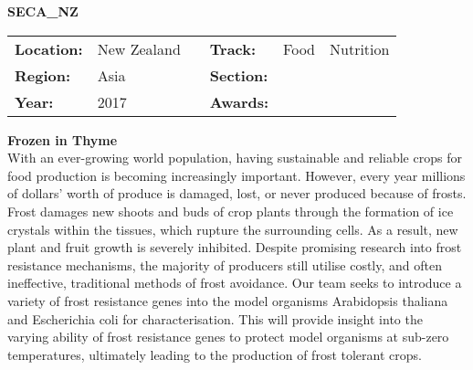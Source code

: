 \textbf{\uppercase{SECA\_NZ}}
\FloatBarrier
\begin{table}[h]
\begin{tabular}{lp{2.5cm}llll}
\textbf{Location:} & New Zealand & \multicolumn{1}{|l}{} & \textbf{Track:}   & Food & Nutrition \\
\textbf{Region:}   & Asia   & \multicolumn{1}{|l}{} & \textbf{Section:} &  \\
\textbf{Year:}     & 2017   & \multicolumn{1}{|l}{} & \textbf{Awards:}  &
\end{tabular}
\end{table}
\FloatBarrier
\noindent	\textbf{Frozen in Thyme} \vspace{.2cm}\\
With an ever-growing world population, having sustainable and reliable crops for food production
is becoming increasingly important. However, every year millions of dollars’ worth of produce is damaged, lost, or never produced because of frosts. Frost damages new shoots and buds of crop plants through the formation of ice crystals within the tissues, which rupture the surrounding cells. As a result, new plant and fruit growth is severely inhibited. Despite promising research into frost resistance mechanisms, the majority of producers still utilise costly, and often ineffective, traditional methods of frost avoidance. Our team seeks to introduce a variety of frost resistance genes into the model organisms Arabidopsis thaliana and Escherichia coli for characterisation. This will provide insight into the varying ability of frost resistance genes to protect model organisms at sub-zero temperatures, ultimately leading to the production of frost tolerant crops.
\vspace{2cm} $ $
\pagebreak

